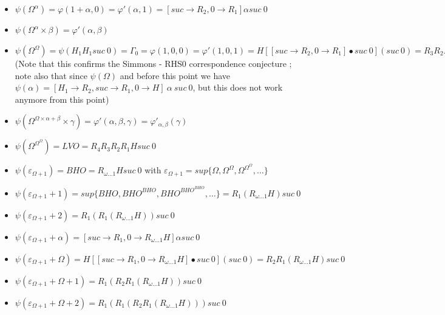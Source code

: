 \documentclass[10pt]{article}
\begin{document}
\begin{itemize}
\item \( \psi(\Omega^\alpha) = \varphi(1+\alpha,0) = \varphi'(\alpha,1) = [suc \rightarrow R_2, 0 \rightarrow R_1] \alpha suc\ 0 \)

\item \( \psi(\Omega^\alpha \times \beta) = \varphi'(\alpha,\beta) \)

\item \( \psi(\Omega^\Omega) = \psi(H_1 H_1 suc\ 0) = \Gamma_0 = \varphi(1,0,0) = \varphi'(1,0,1) = H [[suc \rightarrow R_2, 0 \rightarrow R_1] \bullet suc\ 0] (suc\ 0) = R_3 R_2 R_1 H suc\ 0 \) (Note that this confirms the Simmons - RHS0 correspondence conjecture ; note also that since \( \psi(\Omega) \) and before this point we have \( \psi(\alpha) = [H_1 \rightarrow R_2,suc \rightarrow R_1, 0 \rightarrow H]\ \alpha \ suc\ 0 \), but this does not work anymore from this point)

\item \( \psi(\Omega^{\Omega \times \alpha + \beta} \times \gamma) = \varphi'(\alpha,\beta,\gamma) = \varphi'_{\alpha,\beta}(\gamma) \)

\item \( \psi(\Omega^{\Omega^\Omega}) = LVO = R_4 R_3 R_2 R_1 H suc\ 0 \)
\item \( \psi(\varepsilon_{\Omega+1}) = BHO = R_{\omega \ldots 1} H suc\ 0 \) with \( \varepsilon_{\Omega+1} = sup \lbrace \Omega, \Omega^\Omega, \Omega^{\Omega^\Omega}, \ldots \rbrace \)


\item \( \psi(\varepsilon_{\Omega+1}+1) = sup \lbrace BHO, BHO^{BHO}, BHO^{BHO^{BHO}}, \ldots \rbrace = R_1 (R_{\omega \ldots 1} H) suc\ 0 \)

\item \( \psi(\varepsilon_{\Omega+1}+2) = R_1 (R_1 (R_{\omega \ldots 1} H)) suc\ 0 \)

\item \( \psi(\varepsilon_{\Omega+1}+\alpha) = [suc \rightarrow R_1, 0 \rightarrow R_{\omega \ldots 1} H] \alpha suc\ 0 \)

\item \( \psi(\varepsilon_{\Omega+1}+\Omega) = H [[suc \rightarrow R_1, 0 \rightarrow R_{\omega \ldots 1} H] \bullet suc\ 0] (suc\ 0) = R_2 R_1 (R_{\omega \ldots 1} H) suc\ 0 \)

\item \( \psi(\varepsilon_{\Omega+1}+\Omega+1) = R_1 (R_2 R_1 (R_{\omega \ldots 1} H)) suc\ 0 \)

\item \( \psi(\varepsilon_{\Omega+1}+\Omega+2) = R_1 (R_1 (R_2 R_1 (R_{\omega \ldots 1} H))) suc\ 0 \)


\end{itemize}
\end{document}
